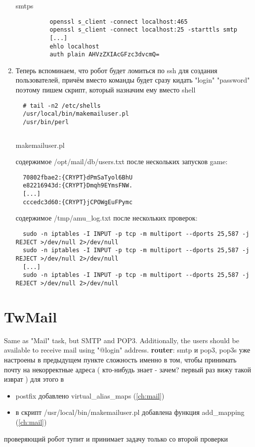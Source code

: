 \documentclass[a4paper,10pt]{report}
\begin{document}
\begin{enumerate}
\begin{description}
    \item[smtps] \begin{verbatim}
    openssl s_client -connect localhost:465
    openssl s_client -connect localhost:25 -starttls smtp
    [...]
    ehlo localhost
    auth plain AHVzZXIAcGFzc3dvcmQ=
    \end{verbatim}
  \end{description}
  \item Теперь вспоминаем, что робот будет ломиться по ssh для создания пользователей, причём вместо команды будет сразу кидать "login" "password"
  поэтому пишем скрипт, который назначим ему вместо shell
  \begin{verbatim}
  # tail -n2 /etc/shells 
  /usr/local/bin/makemailuser.pl
  /usr/bin/perl
  \end{verbatim}
  \begin{listing}[H]
    \inputminted[linenos=true, fontsize=\scriptsize, samepage=true]{perl}{makemailuser.pl}
    \caption{makemailuser.pl}
    \label{lst:makemailuser.pl}
  \end{listing}
  содержимое /opt/mail/db/users.txt после нескольких запусков game:
  \begin{verbatim}
  70802fbae2:{CRYPT}dPmSaTyol6BhU
  e82216943d:{CRYPT}Dmqh9EYmsFNW.
  [...]
  cccedc3d60:{CRYPT}jCPOWgEuFPymc
  \end{verbatim}
  содержимое /tmp/amu\_log.txt после нескольких проверок:
  \begin{verbatim}
  sudo -n iptables -I INPUT -p tcp -m multiport --dports 25,587 -j REJECT >/dev/null 2>/dev/null
  sudo -n iptables -I INPUT -p tcp -m multiport --dports 25,587 -j REJECT >/dev/null 2>/dev/null
  [...]
  sudo -n iptables -I INPUT -p tcp -m multiport --dports 25,587 -j REJECT >/dev/null 2>/dev/null
  \end{verbatim}
\end{enumerate}

\chapter{TwMail}
Same as "Mail" task, but SMTP and POP3.
\newline  
Additionally, the users should be available to receive mail using "@login" address.
\newline\newline
\textbf{router}:
\newline
smtp и pop3, pop3s уже настроены в предыдущем пункте
\newline
сложность именно в том, чтобы принимать почту на некорректные адреса ( кто-нибудь знает - зачем? первый раз вижу такой изврат )
\newline
для этого в
\begin{itemize}
  \item postfix добавлено virtual\_alias\_maps (\ref{ch:mail})
  \item в скрипт /usr/local/bin/makemailuser.pl добавлена функция add\_mapping (\ref{ch:mail})
\end{itemize}
проверяющий робот тупит и принимает задачу только со второй проверки
\end{document}
